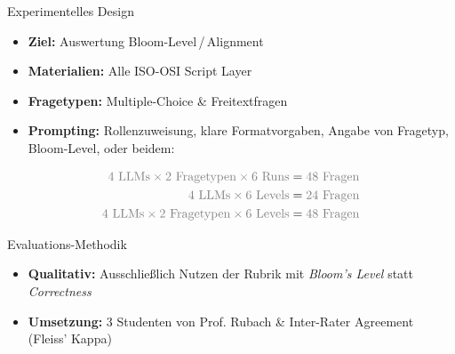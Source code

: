\documentclass[usenames, dvipsnames, aspectratio=32]{beamer}
\begin{document}
\begin{frame}[allowframebreaks]{Experimentelles Design}
    \begin{itemize}
        \item \textbf{Ziel:} Auswertung Bloom-Level\,/\,Alignment
        \item \textbf{Materialien:} Alle ISO-OSI Script Layer
        \item \textbf{Fragetypen:} Multiple-Choice \& Freitextfragen
        \item \textbf{Prompting:} Rollenzuweisung, klare Formatvorgaben, Angabe von Fragetyp, Bloom-Level, oder beidem:
    \end{itemize}
    \begin{align*}
        \textcolor{gray}{4 \text{ LLMs}\times 2 \text{ Fragetypen}\times 6 \text{ Runs}} &= \textcolor{gray}{48 \text{ Fragen}} \\
        \textcolor{gray}{4 \text{ LLMs}\times 6 \text{ Levels}} &= \textcolor{gray}{24 \text{ Fragen}} \\
        \textcolor{gray}{4 \text{ LLMs}\times 2 \text{ Fragetypen}\times 6 \text{ Levels}} &= \textcolor{gray}{48 \text{ Fragen}}
    \end{align*}
\end{frame}

\begin{frame}{Evaluations-Methodik}
    \begin{itemize}
        \item \textbf{Qualitativ:} Ausschließlich Nutzen der Rubrik mit \textit{Bloom's Level} statt \textit{Correctness}
        \item \textbf{Umsetzung:} 3 Studenten von Prof. Rubach \& Inter-Rater Agreement (Fleiss' Kappa)
    \end{itemize}
\end{frame}
\end{document}
